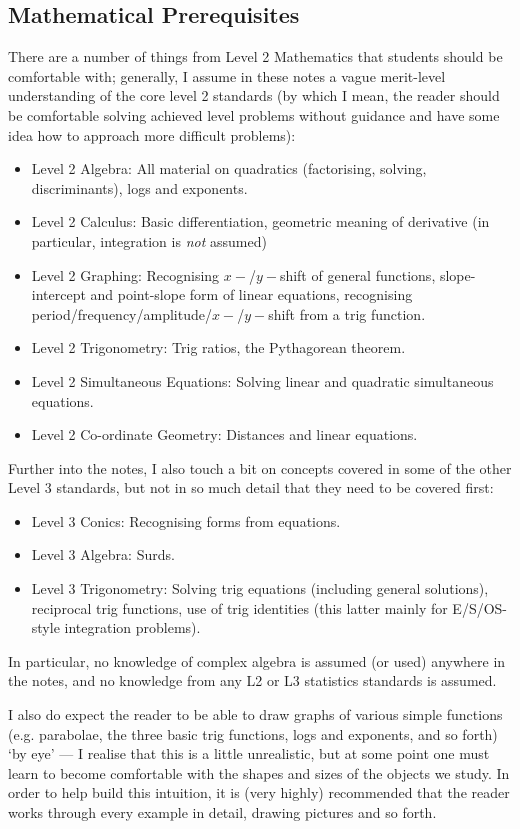 \subsection*{Mathematical Prerequisites}
There are a number of things from Level 2 Mathematics that students should be
comfortable with; generally, I assume in these notes a vague merit-level understanding
of the core level 2 standards (by which I mean, the reader should be comfortable solving
achieved level problems without guidance and have some idea how to approach more difficult
problems):
\begin{itemize}
  \item Level 2 Algebra: All material on quadratics (factorising, solving, discriminants), logs and exponents.
  \item Level 2 Calculus: Basic differentiation, geometric meaning of derivative (in particular, integration is \textit{not} assumed)
  \item Level 2 Graphing: Recognising $ x-$/$ y-$shift of general functions, slope-intercept and point-slope form of linear equations,
                          recognising period/frequency/amplitude/$ x-$/$ y-$shift from a trig function.
  \item Level 2 Trigonometry: Trig ratios, the Pythagorean theorem.
  \item Level 2 Simultaneous Equations: Solving linear and quadratic simultaneous equations.
  \item Level 2 Co-ordinate Geometry: Distances and linear equations.
\end{itemize}

Further into the notes, I also touch a bit on concepts covered in some of the other Level 3 standards,
but not in so much detail that they need to be covered first:
\begin{itemize}
  \item Level 3 Conics: Recognising forms from equations.
  \item Level 3 Algebra: Surds.
  \item Level 3 Trigonometry: Solving trig equations (including general solutions), reciprocal trig functions, use
                              of trig identities (this latter mainly for E/S/OS-style integration problems).
\end{itemize}
In particular, no knowledge of complex algebra is assumed (or used) anywhere in the notes, and no knowledge from any L2 or L3 statistics standards is assumed.

I also do expect the reader to be able to draw graphs of various simple functions (e.g. parabolae, the three basic trig functions, logs and
exponents, and so forth) `by eye' --- I realise that this is a little unrealistic, but at some point one must learn to become comfortable
with the shapes and sizes of the objects we study. In order to help build this intuition, it is (very highly) recommended that the reader
works through every example in detail, drawing pictures and so forth.

